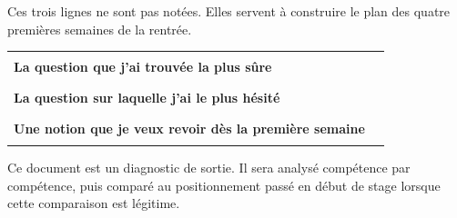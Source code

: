 \documentclass[10pt,a4paper]{article}
\begin{document}
\brouillon{\dimexpr\textheight/3\relax}
\newpage
{}
\begin{methodbox}Ces trois lignes ne sont pas notées. Elles servent à construire le plan des quatre premières semaines de la rentrée.\end{methodbox}
\par\noindent\begin{tabularx}{\linewidth}{>{\bfseries}p{62mm} X}
\toprule
La question que j'ai trouvée la plus sûre & \rule{85mm}{0.32pt} \\
La question sur laquelle j'ai le plus hésité & \rule{85mm}{0.32pt} \\
Une notion que je veux revoir dès la première semaine & \rule{85mm}{0.32pt} \\
\bottomrule\end{tabularx}
\vfill
\begin{graybox}\small Ce document est un diagnostic de sortie. Il sera analysé compétence par compétence, puis comparé au positionnement passé en début de stage lorsque cette comparaison est légitime.\end{graybox}
\end{document}
